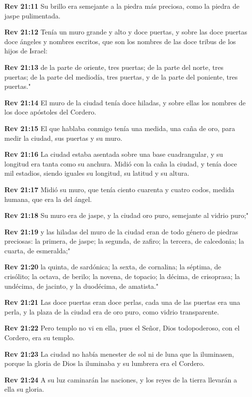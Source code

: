 \textbf{Rev 21:11} Su brillo era semejante a la piedra más preciosa, como la piedra de jaspe pulimentada. 

\textbf{Rev 21:12} Tenía un muro grande y alto y doce puertas, y sobre las doce puertas doce ángeles y nombres escritos, que son los nombres de las doce tribus de los hijos de Israel: 

\textbf{Rev 21:13} de la parte de oriente, tres puertas; de la parte del norte, tres puertas; de la parte del mediodía, tres puertas, y de la parte del poniente, tres puertas." 

\textbf{Rev 21:14} El muro de la ciudad tenía doce hiladas, y sobre ellas los nombres de los doce apóstoles del Cordero. 

\textbf{Rev 21:15} El que hablaba conmigo tenía una medida, una caña de oro, para medir la ciudad, sus puertas y su muro. 

\textbf{Rev 21:16} La ciudad estaba asentada sobre una base cuadrangular, y su longitud era tanta como su anchura. Midió con la caña la ciudad, y tenía doce mil estadios, siendo iguales su longitud, su latitud y su altura. 

\textbf{Rev 21:17} Midió su muro, que tenía ciento cuarenta y cuatro codos, medida humana, que era la del ángel. 

\textbf{Rev 21:18} Su muro era de jaspe, y la ciudad oro puro, semejante al vidrio puro;" 

\textbf{Rev 21:19} y las hiladas del muro de la ciudad eran de todo género de piedras preciosas: la primera, de jaspe; la segunda, de zafiro; la tercera, de calcedonia; la cuarta, de esmeralda;" 

\textbf{Rev 21:20} la quinta, de sardónica; la sexta, de cornalina; la séptima, de crisólito; la octava, de berilo; la novena, de topacio; la décima, de crisoprasa; la undécima, de jacinto, y la duodécima, de amatista." 

\textbf{Rev 21:21} Las doce puertas eran doce perlas, cada una de las puertas era una perla, y la plaza de la ciudad era de oro puro, como vidrio transparente. 

\textbf{Rev 21:22} Pero templo no vi en ella, pues el Señor, Dios todopoderoso, con el Cordero, era su templo. 

\textbf{Rev 21:23} La ciudad no había menester de sol ni de luna que la iluminasen, porque la gloria de Dios la iluminaba y su lumbrera era el Cordero. 

\textbf{Rev 21:24} A su luz caminarán las naciones, y los reyes de la tierra llevarán a ella su gloria. 

